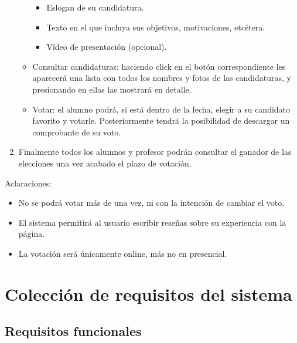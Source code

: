 \documentclass{article}
\begin{document}
\begin{enumerate}
\begin{itemize}
            \begin{itemize}
                \item Eslogan de su candidatura.
                \item Texto en el que incluya sus objetivos, motivaciones, etcétera.
                \item Vídeo de presentación (opcional).
            \end{itemize}
            \item Consultar candidaturas: haciendo click en el botón correspondiente les aparecerá una lista con todos los nombres y fotos de las candidaturas, y presionando en ellas las mostrará en detalle.
            \item Votar: el alumno podrá, si está dentro de la fecha, elegir a su candidato favorito y votarle. Posteriormente tendrá la posibilidad de descargar un comprobante de su voto.
        \end{itemize}
        \item Finalmente todos los alumnos y profesor podrán consultar el ganador de las elecciones una vez acabado el plazo de votación.
    \end{enumerate}
    Aclaraciones:
    \begin{itemize}
        \item No se podrá votar más de una vez, ni con la intención de cambiar el voto.
        \item El sistema permitirá al usuario escribir reseñas sobre su experiencia con la página.
        \item La votación será únicamente online, más no en presencial.
    \end{itemize}

\newpage
\section{Colección de requisitos del sistema}
    \subsection{Requisitos funcionales}
\end{document}
